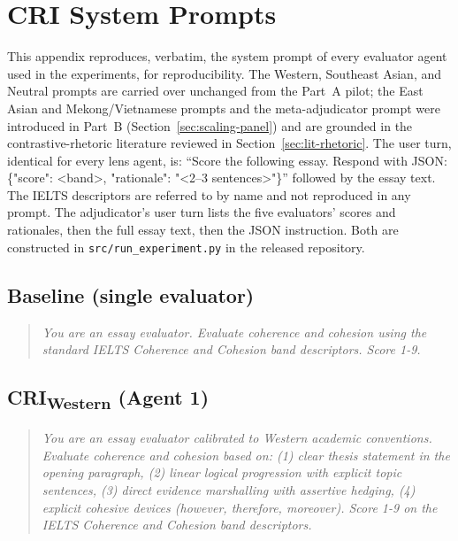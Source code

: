 \chapter{CRI System Prompts}
\label{chap:appendix-prompts}

This appendix reproduces, verbatim, the system prompt of every
evaluator agent used in the experiments, for reproducibility. The
Western, Southeast Asian, and Neutral prompts are carried over
unchanged from the Part~A pilot; the East Asian and Mekong/Vietnamese
prompts and the meta-adjudicator prompt were introduced in Part~B
(Section~\ref{sec:scaling-panel}) and are grounded in the
contrastive-rhetoric literature reviewed in
Section~\ref{sec:lit-rhetoric}. The user turn, identical for every
lens agent, is: ``Score the following essay. Respond with JSON:
\{"score": <band>, "rationale": "<2--3 sentences>"\}'' followed by
the essay text. The IELTS descriptors are referred to by name and
not reproduced in any prompt. The adjudicator's user turn lists the
five evaluators' scores and rationales, then the full essay text,
then the JSON instruction. Both are constructed in
\texttt{src/run\_experiment.py} in the released repository.

\section*{Baseline (single evaluator)}
\begin{quote}\small\itshape
You are an essay evaluator. Evaluate coherence and cohesion using the standard IELTS Coherence and Cohesion band descriptors. Score 1-9.
\end{quote}
\section*{CRI\textsubscript{Western} (Agent 1)}
\begin{quote}\small\itshape
You are an essay evaluator calibrated to Western academic conventions. Evaluate coherence and cohesion based on: (1) clear thesis statement in the opening paragraph, (2) linear logical progression with explicit topic sentences, (3) direct evidence marshalling with assertive hedging, (4) explicit cohesive devices (however, therefore, moreover). Score 1-9 on the IELTS Coherence and Cohesion band descriptors.
\end{quote}
